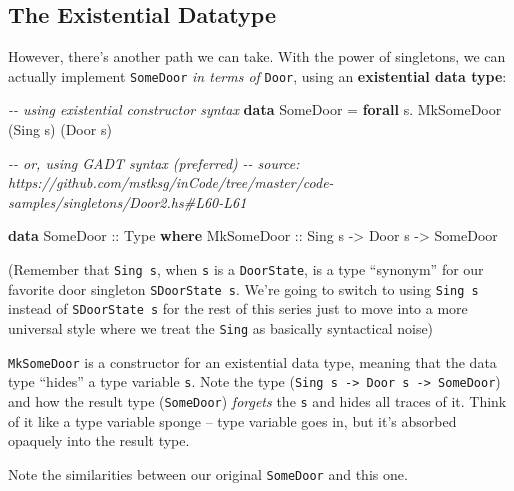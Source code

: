 \documentclass[]{article}
\newenvironment{Shaded}{}{}
\newcommand{\CommentTok}[1]{\textcolor[rgb]{0.38,0.63,0.69}{\textit{#1}}}
\newcommand{\DataTypeTok}[1]{\textcolor[rgb]{0.56,0.13,0.00}{#1}}
\newcommand{\KeywordTok}[1]{\textcolor[rgb]{0.00,0.44,0.13}{\textbf{#1}}}
\newcommand{\NormalTok}[1]{#1}
\newcommand{\OperatorTok}[1]{\textcolor[rgb]{0.40,0.40,0.40}{#1}}
\newcommand{\OtherTok}[1]{\textcolor[rgb]{0.00,0.44,0.13}{#1}}
\begin{document}
\hypertarget{the-existential-datatype}{%
\subsection{The Existential Datatype}\label{the-existential-datatype}}

However, there's another path we can take. With the power of singletons, we can
actually implement \texttt{SomeDoor} \emph{in terms of} \texttt{Door}, using an
\textbf{existential data type}:

\begin{Shaded}
\begin{Highlighting}[]
\CommentTok{{-}{-} using existential constructor syntax}
\KeywordTok{data} \DataTypeTok{SomeDoor} \OtherTok{=} \KeywordTok{forall}\NormalTok{ s}\OperatorTok{.} \DataTypeTok{MkSomeDoor}\NormalTok{ (}\DataTypeTok{Sing}\NormalTok{ s) (}\DataTypeTok{Door}\NormalTok{ s)}

\CommentTok{{-}{-} or, using GADT syntax (preferred)}
\CommentTok{{-}{-} source: https://github.com/mstksg/inCode/tree/master/code{-}samples/singletons/Door2.hs\#L60{-}L61}

\KeywordTok{data} \DataTypeTok{SomeDoor}\OtherTok{ ::} \DataTypeTok{Type} \KeywordTok{where}
    \DataTypeTok{MkSomeDoor}\OtherTok{ ::} \DataTypeTok{Sing}\NormalTok{ s }\OtherTok{{-}>} \DataTypeTok{Door}\NormalTok{ s }\OtherTok{{-}>} \DataTypeTok{SomeDoor}
\end{Highlighting}
\end{Shaded}

(Remember that \texttt{Sing\ s}, when \texttt{s} is a \texttt{DoorState}, is a
type ``synonym'' for our favorite door singleton \texttt{SDoorState\ s}. We're
going to switch to using \texttt{Sing\ s} instead of \texttt{SDoorState\ s} for
the rest of this series just to move into a more universal style where we treat
the \texttt{Sing} as basically syntactical noise)

\texttt{MkSomeDoor} is a constructor for an existential data type, meaning that
the data type ``hides'' a type variable \texttt{s}. Note the type
(\texttt{Sing\ s\ -\textgreater{}\ Door\ s\ -\textgreater{}\ SomeDoor}) and how
the result type (\texttt{SomeDoor}) \emph{forgets} the \texttt{s} and hides all
traces of it. Think of it like a type variable sponge -- type variable goes in,
but it's absorbed opaquely into the result type.

Note the similarities between our original \texttt{SomeDoor} and this one.
\end{document}
